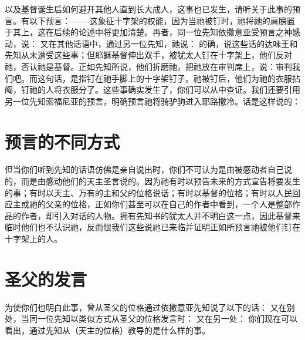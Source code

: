 以及基督诞生后如何避开其他人直到长大成人，这事也已发生，请听关于此事的预言。有以下预言：——  这象征十字架的权能，因为当祂被钉时，祂将祂的肩膀置于其上，这在后续的论述中将更加清楚。再者，同一位先知依撒意亚受预言之神感动，说：  又在其他话语中，通过另一位先知，祂说： 的确，说这些话的达味王和先知从未遭受这些事；但耶稣基督伸出双手，被犹太人钉在十字架上，他们反对祂，否认祂是基督。正如先知所说，他们折磨祂，把祂放在审判席上，说：审判我们吧。而这句话，是指钉在祂手脚上的十字架钉子。祂被钉后，他们为祂的衣服拈阄，钉祂的人将衣服分了。这些事确实发生了，你们可以从中查证。我们还要引用另一位先知索福尼亚的预言，明确预言祂将骑驴驹进入耶路撒冷。话是这样说的： \par


\section{预言的不同方式}

但当你们听到先知的话语仿佛是亲自说出时，你们不可认为是由被感动者自己说的，而是由感动他们的天主圣言说的。因为祂有时以预告未来的方式宣告将要发生的事；有时以天主、万有的主和父的位格说话；有时以基督的位格；有时以人民回应主或祂的父亲的位格，正如你们甚至可以在自己的作者中看到，一个人是整部作品的作者，却引入对话的人物。拥有先知书的犹太人并不明白这一点，因此基督来临时他们也不认识祂，反而恨我们这些说祂已来临并证明正如所预言祂被他们钉在十字架上的人。\par


\section{圣父的发言}

为使你们也明白此事，曾从圣父的位格通过依撒意亚先知说了以下的话： 又在别处，当同一位先知以类似方式从圣父的位格发言时：  又在另一处：  你们现在可以看出，通过先知从（天主的位格）教导的是什么样的事。\par

